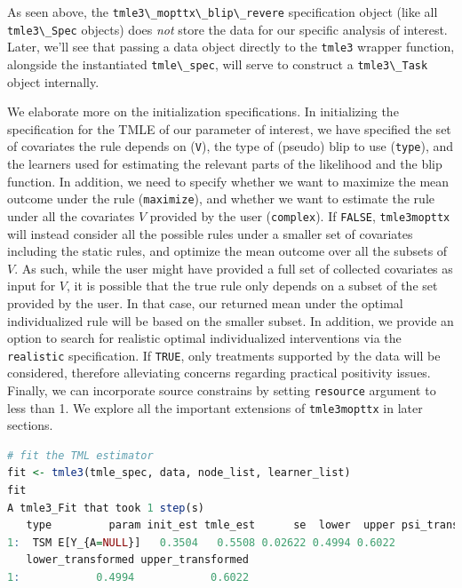 \documentclass[
  12pt, krantz2,
]{krantz}
\newcommand{\passthrough}[1]{#1}
\newcommand{\1}{\mathbbm{1}}
\theoremstyle{definition}
\theoremstyle{definition}
\theoremstyle{definition}
\theoremstyle{definition}
\theoremstyle{remark}
\begin{document}
As seen above, the \passthrough{\lstinline!tmle3\_mopttx\_blip\_revere!} specification object
(like all \passthrough{\lstinline!tmle3\_Spec!} objects) does \emph{not} store the data for our
specific analysis of interest. Later,
we'll see that passing a data object directly to the \passthrough{\lstinline!tmle3!} wrapper function,
alongside the instantiated \passthrough{\lstinline!tmle\_spec!}, will serve to construct a \passthrough{\lstinline!tmle3\_Task!}
object internally.

We elaborate more on the initialization specifications. In initializing the
specification for the TMLE of our parameter of interest, we have specified the
set of covariates the rule depends on (\passthrough{\lstinline!V!}), the type of (pseudo) blip to use
(\passthrough{\lstinline!type!}), and the learners used for estimating the relevant parts of the
likelihood and the blip function. In addition, we need to specify whether we
want to maximize the mean outcome under the rule (\passthrough{\lstinline!maximize!}), and whether we
want to estimate the rule under all the covariates \(V\) provided by the user
(\passthrough{\lstinline!complex!}). If \passthrough{\lstinline!FALSE!}, \passthrough{\lstinline!tmle3mopttx!} will instead consider all the possible
rules under a smaller set of covariates including the static rules, and optimize
the mean outcome over all the subsets of \(V\). As such, while the user might have
provided a full set of collected covariates as input for \(V\), it is possible
that the true rule only depends on a subset of the set provided by the user. In
that case, our returned mean under the optimal individualized rule will be based
on the smaller subset. In addition, we provide an option to search for realistic
optimal individualized interventions via the \passthrough{\lstinline!realistic!} specification. If
\passthrough{\lstinline!TRUE!}, only treatments supported by the data will be considered, therefore
alleviating concerns regarding practical positivity issues. Finally, we can incorporate
source constrains by setting \passthrough{\lstinline!resource!} argument to less than 1. We explore all the
important extensions of \passthrough{\lstinline!tmle3mopttx!} in later sections.

\begin{lstlisting}[language=R]
# fit the TML estimator
fit <- tmle3(tmle_spec, data, node_list, learner_list)
fit
A tmle3_Fit that took 1 step(s)
   type         param init_est tmle_est      se  lower  upper psi_transformed
1:  TSM E[Y_{A=NULL}]   0.3504   0.5508 0.02622 0.4994 0.6022          0.5508
   lower_transformed upper_transformed
1:            0.4994            0.6022
\end{lstlisting}
\end{document}
